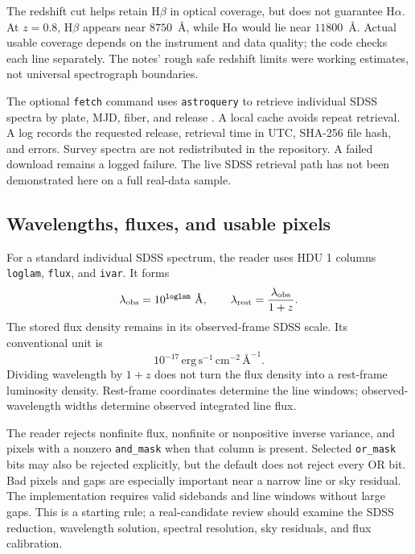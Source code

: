 \documentclass[11pt,a4paper]{article}
\begin{document}
The redshift cut helps retain H$\beta$ in optical coverage, but does not guarantee H$\alpha$. At $z=0.8$, H$\beta$ appears near $8750$~\AA, while H$\alpha$ would lie near $11800$~\AA. Actual usable coverage depends on the instrument and data quality; the code checks each line separately. The notes' rough safe redshift limits were working estimates, not universal spectrograph boundaries.

The optional \texttt{fetch} command uses \texttt{astroquery} to retrieve individual SDSS spectra by plate, MJD, fiber, and release \cite{astroquery}. A local cache avoids repeat retrieval. A log records the requested release, retrieval time in UTC, SHA-256 file hash, and errors. Survey spectra are not redistributed in the repository. A failed download remains a logged failure. The live SDSS retrieval path has not been demonstrated here on a full real-data sample.

\subsection{Wavelengths, fluxes, and usable pixels}
For a standard individual SDSS spectrum, the reader uses HDU 1 columns \texttt{loglam}, \texttt{flux}, and \texttt{ivar}. It forms
\begin{equation}
\lambda_{\rm obs}=10^{\texttt{loglam}}\ \text{\AA},
\qquad
\lambda_{\rm rest}=\frac{\lambda_{\rm obs}}{1+z}.
\label{eq:wavelength}
\end{equation}
The stored flux density remains in its observed-frame SDSS scale. Its conventional unit is
\[
10^{-17}\,\mathrm{erg\,s^{-1}\,cm^{-2}}\,\text{\AA}^{-1}.
\]
Dividing wavelength by $1+z$ does not turn the flux density into a rest-frame luminosity density. Rest-frame coordinates determine the line windows; observed-wavelength widths determine observed integrated line flux.

The reader rejects nonfinite flux, nonfinite or nonpositive inverse variance, and pixels with a nonzero \texttt{and\_mask} when that column is present. Selected \texttt{or\_mask} bits may also be rejected explicitly, but the default does not reject every OR bit. Bad pixels and gaps are especially important near a narrow line or sky residual. The implementation requires valid sidebands and line windows without large gaps. This is a starting rule; a real-candidate review should examine the SDSS reduction, wavelength solution, spectral resolution, sky residuals, and flux calibration.
\end{document}

